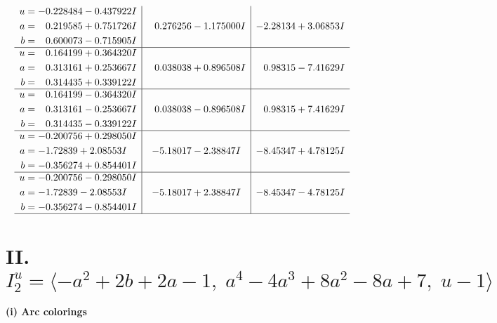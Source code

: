 \documentclass[1p]{elsarticle_modified}
\theoremstyle{definition}
\begin{document}
$$\begin{array}{c|c|c}
\begin{aligned}
u &= -0.228484 - 0.437922 I \\
a &= \phantom{-}0.219585 + 0.751726 I \\
b &= \phantom{-}0.600073 - 0.715905 I\end{aligned}
 & \phantom{-}0.276256 - 1.175000 I & -2.28134 + 3.06853 I \\ \hline\begin{aligned}
u &= \phantom{-}0.164199 + 0.364320 I \\
a &= \phantom{-}0.313161 + 0.253667 I \\
b &= \phantom{-}0.314435 + 0.339122 I\end{aligned}
 & \phantom{-}0.038038 + 0.896508 I & \phantom{-}0.98315 - 7.41629 I \\ \hline\begin{aligned}
u &= \phantom{-}0.164199 - 0.364320 I \\
a &= \phantom{-}0.313161 - 0.253667 I \\
b &= \phantom{-}0.314435 - 0.339122 I\end{aligned}
 & \phantom{-}0.038038 - 0.896508 I & \phantom{-}0.98315 + 7.41629 I \\ \hline\begin{aligned}
u &= -0.200756 + 0.298050 I \\
a &= -1.72839 + 2.08553 I \\
b &= -0.356274 + 0.854401 I\end{aligned}
 & -5.18017 - 2.38847 I & -8.45347 + 4.78125 I \\ \hline\begin{aligned}
u &= -0.200756 - 0.298050 I \\
a &= -1.72839 - 2.08553 I \\
b &= -0.356274 - 0.854401 I\end{aligned}
 & -5.18017 + 2.38847 I & -8.45347 - 4.78125 I\\
 \hline 
 \end{array}$$\newpage\newpage\renewcommand{\arraystretch}{1}
\centering \section*{II. $I^u_{2}= \langle - a^2+2 b+2 a-1,\;a^4-4 a^3+8 a^2-8 a+7,\;u-1 \rangle$}
\flushleft \textbf{(i) Arc colorings}\\
\end{document}
